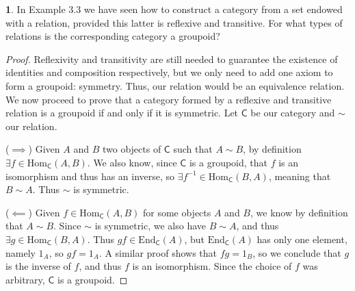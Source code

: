 \documentclass{article}
\theoremstyle{definition}
\newtheorem{ex}{}[section]
\begin{document}
\begin{ex}
	In Example 3.3 we have seen how to construct a category from a set endowed with a relation, provided this latter is reflexive and transitive.
	For what types of relations is the corresponding category a groupoid?
\end{ex}
\begin{proof}
	Reflexivity and transitivity are still needed to guarantee the existence of identities and composition respectively, but we only need to add one axiom to form a groupoid: symmetry.
	Thus, our relation would be an equivalence relation.
	We now proceed to prove that a category formed by a reflexive and transitive relation is a groupoid if and only if it is symmetric.
	Let $\mathsf{C}$ be our category and $\sim$ our relation.

	($\implies$) Given $A$ and $B$ two objects of $\mathsf{C}$ such that $A \sim B$, by definition $\exists f \in \mathrm{Hom}_{\mathsf{C}}(A, B)$.
	We also know, since $\mathsf{C}$ is a groupoid, that $f$ is an isomorphism and thus has an inverse, so $\exists f^{-1} \in \mathrm{Hom}_{\mathsf{C}}(B, A)$, meaning that $B \sim A$.
	Thus $\sim$ is symmetric.

	($\impliedby$) Given $f \in \mathrm{Hom}_{\mathsf{C}}(A, B)$ for some objects $A$ and $B$, we know by definition that $A \sim B$.
	Since $\sim$ is symmetric, we also have $B \sim A$, and thus $\exists g \in \mathrm{Hom}_{\mathsf{C}}(B, A)$.
	Thus $gf \in \mathrm{End}_{\mathsf{C}}(A)$, but $\mathrm{End}_{\mathsf{C}}(A)$ has only one element, namely $1_A$, so $gf = 1_A$.
	A similar proof shows that $fg = 1_B$, so we conclude that $g$ is the inverse of $f$, and thus $f$ is an isomorphism.
	Since the choice of $f$ was arbitrary, $\mathsf{C}$ is a groupoid.
\end{proof}
\end{document}
